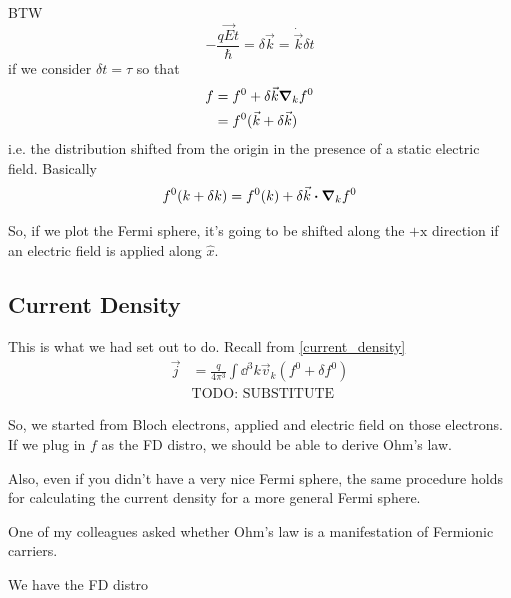 \documentclass[a4paper]{article}
\newcommand{\hcut}{\hbar}
\begin{document}
BTW
\begin{equation}
	-\frac{q\vec{E}t}{\hcut} = \delta \vec{k} = \dot{\vec{k}}\delta t
\end{equation}
if we consider $\delta t = \tau$ so that
\begin{equation}
	\begin{split}
	f &= f^{0} + \delta \vec{k}\grad_kf^{0} \\
	  &= f^{0}(\vec{k} + \delta\vec{k})
	\end{split}
\end{equation}
i.e. the distribution shifted from the origin in the presence of a
static electric field. Basically
\begin{equation}
	f^{0}(k + \delta k) = f^{0}(k) + \delta \vec{k}\vdot\grad_kf^{0}
\end{equation}

So, if we plot the Fermi sphere, it's going to be shifted along the
$+\mathrm{x}$ direction if an electric field is applied along $\hat{x}$.

\subsection*{Current Density}
This is what we had set out to do. Recall from \ref{current_density}
\begin{equation}
	\begin{split}
		\vec{j} &= \frac{q}{4\pi^3}\int \dd^3k \vec{v}_k(f^{0}+ \delta f^{0}) \\
			&\text{TODO: SUBSTITUTE}  %
	\end{split}
\end{equation}

So, we started from Bloch electrons, applied and electric field
on those electrons. If we plug in $f$ as the FD distro, we should
be able to derive Ohm's law.

Also, even if you didn't have a very nice Fermi sphere, the same
procedure holds for calculating the current density for a more
general Fermi sphere.

One of my colleagues asked whether Ohm's law is a manifestation of
Fermionic carriers. 

We have the FD distro
	
\end{document}
